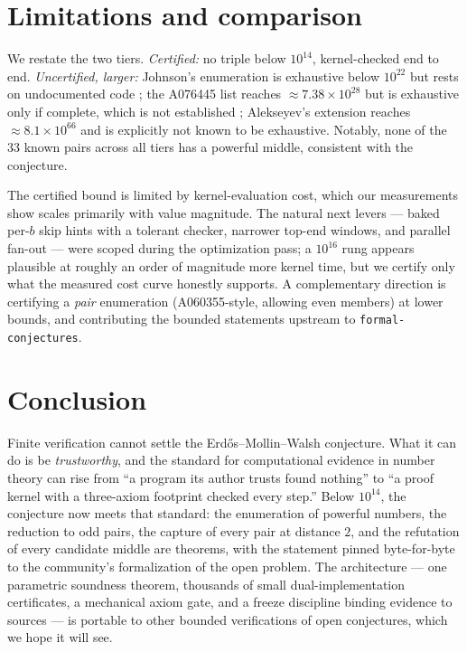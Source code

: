 \documentclass[11pt]{article}
\theoremstyle{definition}
\theoremstyle{remark}
\newcommand{\code}[1]{\texttt{#1}}
\begin{document}
\section{Limitations and comparison}\label{sec:limits}

We restate the two tiers. \emph{Certified:} no triple below $10^{14}$,
kernel-checked end to end. \emph{Uncertified, larger:} Johnson's
enumeration is exhaustive below $10^{22}$ but rests on undocumented code
\cite{OEISA060355}; the A076445 list reaches $\approx 7.38 \times
10^{28}$ but is exhaustive only if complete, which is not established
\cite{OEISA076445}; Alekseyev's extension reaches $\approx 8.1 \times
10^{66}$ and is explicitly not known to be exhaustive. Notably, none of
the $33$ known pairs across all tiers has a powerful middle, consistent
with the conjecture.

The certified bound is limited by kernel-evaluation cost, which our
measurements show scales primarily with value magnitude. The natural next
levers --- baked per-$b$ skip hints with a tolerant checker, narrower
top-end windows, and parallel fan-out --- were scoped during the
optimization pass; a $10^{16}$ rung appears plausible at roughly an order
of magnitude more kernel time, but we certify only what the measured cost
curve honestly supports. A complementary direction is certifying a
\emph{pair} enumeration (A060355-style, allowing even members) at lower
bounds, and contributing the bounded statements upstream to
\code{formal-conjectures}.

\section{Conclusion}\label{sec:conclusion}

Finite verification cannot settle the Erd\H{o}s--Mollin--Walsh
conjecture. What it can do is be \emph{trustworthy}, and the standard for
computational evidence in number theory can rise from ``a program its
author trusts found nothing'' to ``a proof kernel with a three-axiom
footprint checked every step.'' Below $10^{14}$, the conjecture now meets
that standard: the enumeration of powerful numbers, the reduction to odd
pairs, the capture of every pair at distance $2$, and the refutation of
every candidate middle are theorems, with the statement pinned
byte-for-byte to the community's formalization of the open problem. The
architecture --- one parametric soundness theorem, thousands of small
dual-implementation certificates, a mechanical axiom gate, and a freeze
discipline binding evidence to sources --- is portable to other bounded
verifications of open conjectures, which we hope it will see.
\end{document}
